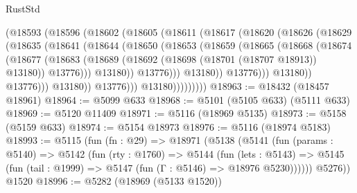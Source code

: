 \begin{lexlean}{RustStd}
\begin{coremodule}
{\begin{coremodule}
{{{{{{{{{{{{{{{{{{{{{{{{{{{{{{{                          (@18593
                            (@18596
                              (@18602
                                (@18605
                                  (@18611
                                    (@18617
                                      (@18620
                                        (@18626
                                          (@18629
                                            (@18635
                                              (@18641
                                                (@18644
                                                  (@18650
                                                    (@18653
                                                      (@18659
                                                        (@18665
                                                          (@18668
                                                            (@18674
                                                              (@18677
                                                                (@18683
                                                                  (@18689
                                                                    (@18692
                                                                      (@18698
                                                                        (@18701 (@18707 @18913))
                                                                        @13180))
                                                                    @13776)))
                                                              @13180))
                                                          @13776)))
                                                    @13180))
                                                @13776)))
                                          @13180))
                                      @13776)))
                                @13180))
                            @13776)))
                      @13180)))))))))
@18963 := @18432 (@18457 @18961)
@18964 := @5099 @633
@18968 := @5101 (@5105 @633) (@5111 @633)
@18969 := @5120 @11409
@18971 := @5116 (@18969 @5135)
@18973 := @5158 (@5159 @633)
@18974 := @5154 @18973
@18976 := @5116 (@18974 @5183)
@18993 := @5115
    (fun (fn : @29) =>
    @18971
      (@5138
        (@5141
          (fun (params : @5140) =>
          @5142
            (fun (rty : @1760) =>
            @5144
              (fun (lets : @5143) =>
              @5145 (fun (tail : @1999) => @5147 (fun (Γ : @5146) => @18976 @5230))))))
        @5276))
    @1520
@18996 := @5282 (@18969 (@5133 @1520))
}}}}}}}}}}}}}}}}}}}}}}}}}}}}}}}
\end{coremodule}}
\end{coremodule}
\end{lexlean}
